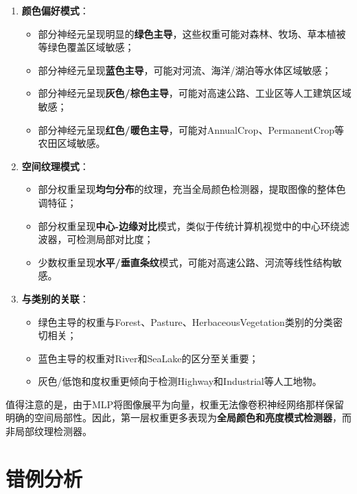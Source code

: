 \documentclass[12pt,a4paper]{article}
\begin{document}
\begin{enumerate}[leftmargin=2em]
    \item \textbf{颜色偏好模式}：
    \begin{itemize}
        \item 部分神经元呈现明显的\textbf{绿色主导}，这些权重可能对森林、牧场、草本植被等绿色覆盖区域敏感；
        \item 部分神经元呈现\textbf{蓝色主导}，可能对河流、海洋/湖泊等水体区域敏感；
        \item 部分神经元呈现\textbf{灰色/棕色主导}，可能对高速公路、工业区等人工建筑区域敏感；
        \item 部分神经元呈现\textbf{红色/暖色主导}，可能对AnnualCrop、PermanentCrop等农田区域敏感。
    \end{itemize}

    \item \textbf{空间纹理模式}：
    \begin{itemize}
        \item 部分权重呈现\textbf{均匀分布}的纹理，充当全局颜色检测器，提取图像的整体色调特征；
        \item 部分权重呈现\textbf{中心-边缘对比}模式，类似于传统计算机视觉中的中心环绕滤波器，可检测局部对比度；
        \item 少数权重呈现\textbf{水平/垂直条纹}模式，可能对高速公路、河流等线性结构敏感。
    \end{itemize}

    \item \textbf{与类别的关联}：
    \begin{itemize}
        \item 绿色主导的权重与Forest、Pasture、HerbaceousVegetation类别的分类密切相关；
        \item 蓝色主导的权重对River和SeaLake的区分至关重要；
        \item 灰色/低饱和度权重更倾向于检测Highway和Industrial等人工地物。
    \end{itemize}
\end{enumerate}

值得注意的是，由于MLP将图像展平为向量，权重无法像卷积神经网络那样保留明确的空间局部性。因此，第一层权重更多表现为\textbf{全局颜色和亮度模式检测器}，而非局部纹理检测器。

\section{错例分析}
\end{document}
